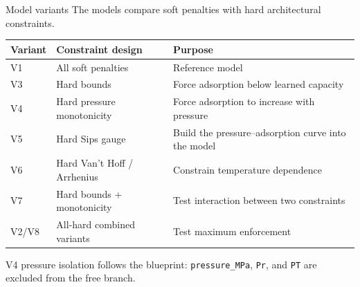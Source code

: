 \documentclass[aspectratio=169,10pt]{beamer}
\newcommand{\smallgray}[1]{\textcolor{projectGray}{#1}}
\begin{document}
\begin{frame}{Model variants}
  \smallgray{The models compare soft penalties with hard architectural constraints.}

  \vspace{0.25cm}
  \begin{table}
    \centering
    \scriptsize
    \begin{tabular}{lll}
      \toprule
      \textbf{Variant} & \textbf{Constraint design} & \textbf{Purpose}                                    \\
      \midrule
      V1               & All soft penalties         & Reference model                                     \\
      V3               & Hard bounds                & Force adsorption below learned capacity             \\
      V4               & Hard pressure monotonicity & Force adsorption to increase with pressure          \\
      V5               & Hard Sips gauge            & Build the pressure--adsorption curve into the model \\
      V6               & Hard Van't Hoff / Arrhenius & Constrain temperature dependence                   \\
      V7               & Hard bounds + monotonicity  & Test interaction between two constraints           \\
      V2/V8            & All-hard combined variants  & Test maximum enforcement                           \\
      \bottomrule
    \end{tabular}
  \end{table}

  \vspace{0.2cm}
  \smallgray{V4 pressure isolation follows the blueprint: \texttt{pressure\_MPa}, \texttt{Pr}, and \texttt{PT} are excluded from the free branch.}
\end{frame}
\end{document}
